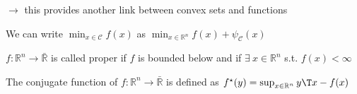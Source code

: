 $\rightarrow$ this provides another link between convex sets and functions

We can write
$\min_{x \in \mathcal{C}}f(x)$ as
$\min_{x \in \mathbb{R}^{n}}f(x) + \psi_\mathcal{C}(x)$

\begin{definition}[3]
	$f: \mathbb{R}^{n}\rightarrow\bar{\mathbb{R}}$ is called proper
	if $f$ is bounded below and
	if $\exists\ x \in \mathbb{R}^{n}$ s.t. $f(x)<\infty$
\end{definition}

\begin{definition}
	The conjugate function of $f: \mathbb{R}^{n}\rightarrow\bar{\mathbb{R}}$  is defined as
	$f^\star(y)=\sup_{x \in \mathbb{R}^{n}}y\T x-f(x)$
\end{definition}


